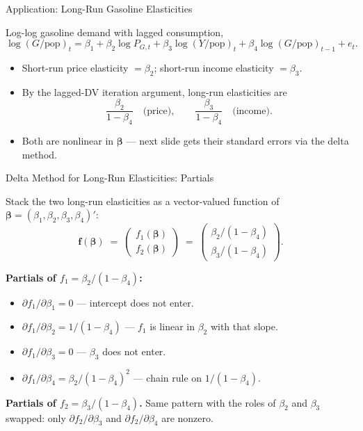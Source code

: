\documentclass[aspectratio=169, handout, t]{beamer}
\numberwithin{equation}{section}
\begin{document}
\begin{frame}{Application: Long-Run Gasoline Elasticities}

Log-log gasoline demand with lagged consumption,
\[
\log(G/\text{pop})_t = \beta_1 + \beta_2 \log P_{G,t} + \beta_3 \log(Y/\text{pop})_t + \beta_4 \log(G/\text{pop})_{t-1} + e_t.
\]

\begin{itemize}
\item Short-run price elasticity $= \beta_2$; short-run income elasticity $= \beta_3$.
\item By the lagged-DV iteration argument, long-run elasticities are
\[
\frac{\beta_2}{1-\beta_4} \quad\text{(price)}, \qquad \frac{\beta_3}{1-\beta_4} \quad\text{(income)}.
\]
\item Both are nonlinear in $\bm{\beta}$ --- next slide gets their standard errors via the delta method.
\end{itemize}

\end{frame}


\begin{frame}{Delta Method for Long-Run Elasticities: Partials}

Stack the two long-run elasticities as a vector-valued function of $\bm{\beta} = (\beta_1, \beta_2, \beta_3, \beta_4)'$:
\[
\bm{f}(\bm{\beta}) \;=\; \begin{pmatrix} f_1(\bm{\beta}) \\ f_2(\bm{\beta}) \end{pmatrix}
\;=\; \begin{pmatrix} \beta_2/(1-\beta_4) \\ \beta_3/(1-\beta_4) \end{pmatrix}.
\]

\pause

\medskip

\textbf{Partials of $f_1 = \beta_2/(1-\beta_4)$:}
\begin{itemize}\setlength\itemsep{2pt}
\item $\partial f_1 / \partial \beta_1 = 0$ --- intercept does not enter.
\item $\partial f_1 / \partial \beta_2 = 1/(1-\beta_4)$ --- $f_1$ is linear in $\beta_2$ with that slope.
\item $\partial f_1 / \partial \beta_3 = 0$ --- $\beta_3$ does not enter.
\item $\partial f_1 / \partial \beta_4 = \beta_2/(1-\beta_4)^2$ --- chain rule on $1/(1-\beta_4)$.
\end{itemize}

\pause

\medskip

\textbf{Partials of $f_2 = \beta_3/(1-\beta_4)$.} Same pattern with the roles of $\beta_2$ and $\beta_3$ swapped: only $\partial f_2/\partial\beta_3$ and $\partial f_2/\partial\beta_4$ are nonzero.

\end{frame}
\end{document}
